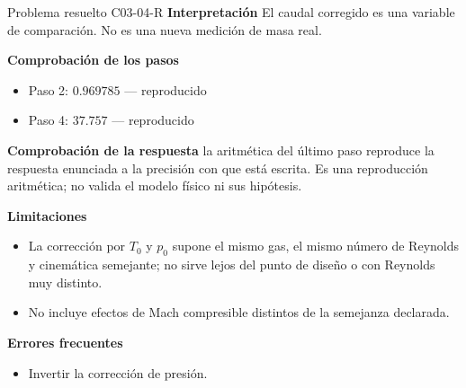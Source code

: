 \documentclass[10pt,openany]{book}
\begin{document}
\begin{studiumworked}{Problema resuelto C03-04-R}
\noindent\textbf{Interpretación}
El caudal corregido es una variable de comparación. No es una nueva medición de masa real.

\noindent\textbf{Comprobación de los pasos}
\begin{itemize}
\item Paso 2: $0.969785$ — reproducido
\item Paso 4: $37.757$ — reproducido
\end{itemize}

\noindent\textbf{Comprobación de la respuesta} la aritmética del último paso reproduce la respuesta enunciada a la precisión con que está escrita. Es una reproducción aritmética; no valida el modelo físico ni sus hipótesis.

\noindent\textbf{Limitaciones}
\begin{itemize}
\item La corrección por $T_0$ y $p_0$ supone el mismo gas, el mismo número de Reynolds y cinemática semejante; no sirve lejos del punto de diseño o con Reynolds muy distinto.
\item No incluye efectos de Mach compresible distintos de la semejanza declarada.
\end{itemize}

\noindent\textbf{Errores frecuentes}
\begin{itemize}
\item Invertir la corrección de presión.
\end{itemize}
\end{studiumworked}
\end{document}
